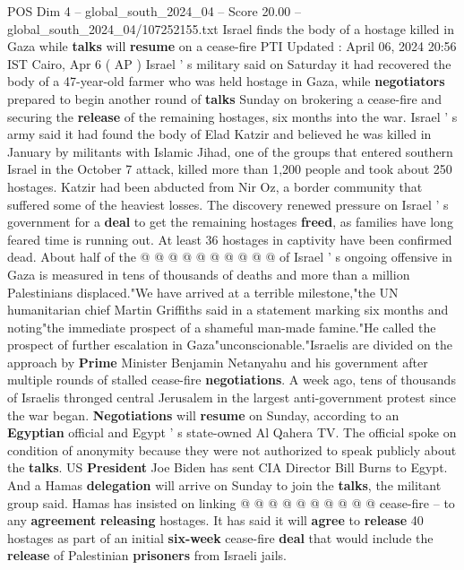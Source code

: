 \begin{textsample}{POS Dim 4 – global\_south\_2024\_04 – Score 20.00 – global\_south\_2024\_04/107252155.txt}  \label{ex:f4_pos_265}
Israel finds the body of a hostage killed in Gaza while \textbf{talks} will \textbf{resume} on a cease-fire PTI Updated : April 06, 2024 20:56 IST Cairo, Apr 6 ( AP ) Israel ' s military said on Saturday it had recovered the body of a 47-year-old farmer who was held hostage in Gaza, while \textbf{negotiators} prepared to begin another round of \textbf{talks} Sunday on brokering a cease-fire and securing the \textbf{release} of the remaining hostages, six months into the war.
Israel ' s army said it had found the body of Elad Katzir and believed he was killed in January by militants with Islamic Jihad, one of the groups that entered southern Israel in the October 7 attack, killed more than 1,200 people and took about 250 hostages.
Katzir had been abducted from Nir Oz, a border community that suffered some of the heaviest losses.
The discovery renewed pressure on Israel ' s government for a \textbf{deal} to get the remaining hostages \textbf{freed}, as families have long feared time is running out.
At least 36 hostages in captivity have been confirmed dead.
About half of the @ @ @ @ @ @ @ @ @ @ of Israel ' s ongoing offensive in Gaza is measured in tens of thousands of deaths and more than a million Palestinians displaced."We have arrived at a terrible milestone,"the UN humanitarian chief Martin Griffiths said in a statement marking six months and noting"the immediate prospect of a shameful man-made famine."He called the prospect of further escalation in Gaza"unconscionable."Israelis are divided on the approach by \textbf{Prime} Minister Benjamin Netanyahu and his government after multiple rounds of stalled cease-fire \textbf{negotiations}.
A week ago, tens of thousands of Israelis thronged central Jerusalem in the largest anti-government protest since the war began. \textbf{Negotiations} will \textbf{resume} on Sunday, according to an \textbf{Egyptian} official and Egypt ' s state-owned Al Qahera TV.
The official spoke on condition of anonymity because they were not authorized to speak publicly about the \textbf{talks}.
US \textbf{President} Joe Biden has sent CIA Director Bill Burns to Egypt.
And a Hamas \textbf{delegation} will arrive on Sunday to join the \textbf{talks}, the militant group said.
Hamas has insisted on linking @ @ @ @ @ @ @ @ @ @ cease-fire -- to any \textbf{agreement} \textbf{releasing} hostages.
It has said it will \textbf{agree} to \textbf{release} 40 hostages as part of an initial \textbf{six-week} cease-fire \textbf{deal} that would include the \textbf{release} of Palestinian \textbf{prisoners} from Israeli jails.

\end{textsample}
